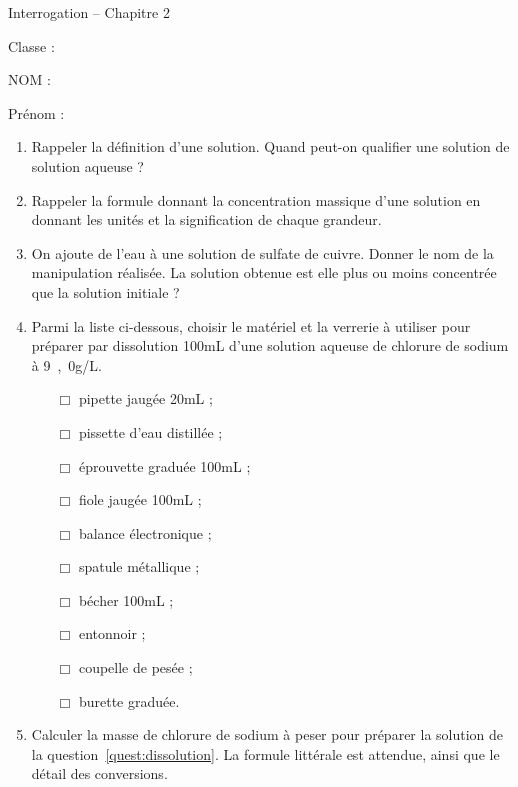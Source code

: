 
\cfoot{} %
\usepackage{setspace}

\newcommand{\Hsquare}{%
  \text{\fboxsep=-.2pt\fbox{\rule{0pt}{1ex}\rule{1ex}{0pt}}}%
}



\begin{header}
Interrogation -- Chapitre 2

\normalsize
\flushleft
\begin{doublespace}
Classe :

NOM :

\end{doublespace}
Prénom :
\end{header}

\begin{enumerate}
\item Rappeler la définition d'une solution.
Quand peut-on qualifier une solution de solution aqueuse ?
\vfill
\item Rappeler la formule donnant la concentration massique d'une solution en donnant les unités et la signification de chaque grandeur.
\vfill
\item On ajoute de l'eau à une solution de sulfate de cuivre.
Donner le nom de la manipulation réalisée.
La solution obtenue est elle plus ou moins concentrée que la solution initiale ?
\vfill
\item Parmi la liste ci-dessous, choisir le matériel et la verrerie à utiliser pour préparer par dissolution \unit{100}{mL} d'une solution aqueuse de chlorure de sodium à \unit{9{,}0}{g/L}.
\label{quest:dissolution}
\begin{multicols}{2}
\begin{itemize}
\item[$\Box$] pipette jaugée \unit{20}{mL} ;
\item[$\Box$] pissette d'eau distillée ;
\item[$\Box$] éprouvette graduée \unit{100}{mL} ;
\item[$\Box$] fiole jaugée \unit{100}{mL} ;
\item[$\Box$] balance électronique ;
\item[$\Box$] spatule métallique ;
\item[$\Box$] bécher \unit{100}{mL} ;
\item[$\Box$] entonnoir ;
\item[$\Box$] coupelle de pesée ;
\item[$\Box$] burette graduée.
\end{itemize}
\end{multicols}

\item Calculer la masse de chlorure de sodium à peser pour préparer la solution de la question~\ref{quest:dissolution}.
La formule littérale est attendue, ainsi que le détail des conversions.
\vfill
\end{enumerate}

